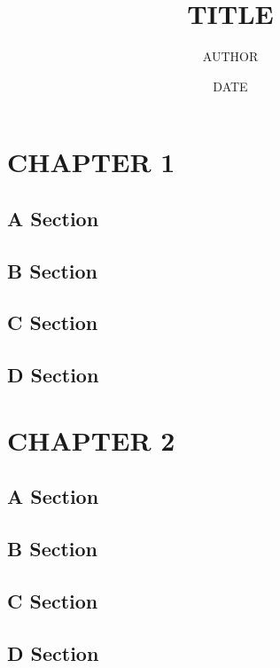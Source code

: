 \documentclass{report}
\title{\Large{\textbf{TITLE}}}
\author{AUTHOR}
\date{DATE}
\begin{document}
	
	\maketitle
	\thispagestyle{empty}
	\let\cleardoublepage\clearpage
	\tableofcontents
	\thispagestyle{empty}
	\pagestyle{fancy}
	
	
	
	\chapter{CHAPTER 1}
	
	\section{A Section}
	\blindtext[2]
	
	\section{B Section}
	\blindtext[2]
	
	\section{C Section}
	\blindtext[2]
	
	\section{D Section}
	\blindtext[2]
	
	\chapter{CHAPTER 2}
	
	\section{A Section}
	\blindtext[2]
	
	\section{B Section}
	\blindtext[2]
	
	\section{C Section}
	\blindtext[2]
	
	\section{D Section}
	\blindtext[2]
   
\end{document}
